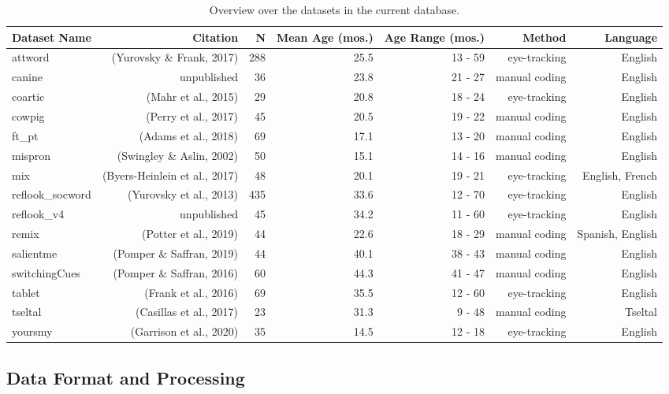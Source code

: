 \documentclass[10pt, letterpaper]{article}
\begin{document}
\begin{table}[ht]
\centering
\begingroup\fontsize{9pt}{10pt}\selectfont
\begin{tabular}{lrrrrrr}
  \hline
Dataset Name & Citation & N & Mean Age (mos.) & Age Range (mos.) & Method & Language \\ 
  \hline
attword & (Yurovsky \& Frank, 2017) & 288 & 25.5 & 13 - 59 & eye-tracking & English \\ 
  canine & unpublished & 36 & 23.8 & 21 - 27 & manual coding & English \\ 
  coartic & (Mahr et al., 2015) & 29 & 20.8 & 18 - 24 & eye-tracking & English \\ 
  cowpig & (Perry et al., 2017) & 45 & 20.5 & 19 - 22 & manual coding & English \\ 
  ft\_pt & (Adams et al., 2018) & 69 & 17.1 & 13 - 20 & manual coding & English \\ 
  mispron & (Swingley \& Aslin, 2002) & 50 & 15.1 & 14 - 16 & manual coding & English \\ 
  mix & (Byers-Heinlein et al., 2017) & 48 & 20.1 & 19 - 21 & eye-tracking & English, French \\ 
  reflook\_socword & (Yurovsky et al., 2013) & 435 & 33.6 & 12 - 70 & eye-tracking & English \\ 
  reflook\_v4 & unpublished & 45 & 34.2 & 11 - 60 & eye-tracking & English \\ 
  remix & (Potter et al., 2019) & 44 & 22.6 & 18 - 29 & manual coding & Spanish, English \\ 
  salientme & (Pomper \& Saffran, 2019) & 44 & 40.1 & 38 - 43 & manual coding & English \\ 
  switchingCues & (Pomper \& Saffran, 2016) & 60 & 44.3 & 41 - 47 & manual coding & English \\ 
  tablet & (Frank et al., 2016) & 69 & 35.5 & 12 - 60 & eye-tracking & English \\ 
  tseltal & (Casillas et al., 2017) & 23 & 31.3 & 9 - 48 & manual coding & Tseltal \\ 
  yoursmy & (Garrison et al., 2020) & 35 & 14.5 & 12 - 18 & eye-tracking & English \\ 
   \hline
\end{tabular}
\endgroup
\caption{Overview over the datasets in the current database.} 
\end{table}

\hypertarget{data-format-and-processing}{%
\subsection{Data Format and
Processing}\label{data-format-and-processing}}
\end{document}
